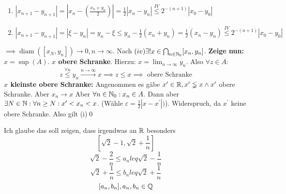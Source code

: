 \begin{subtheorem}
\begin{subproof-headless}
\begin{description}
\begin{itemize}
\begin{description}
\begin{enumerate}[label=(\alph*)]
									\item $ | x_{n+1} - y_{n+1} | = \left| x_n - \left( \frac{x_n + y_n}{2} \right) \right| = \frac{1}{2} | x_n - y_n | \overset{IV}{\leq} 2^{-(n+1)} |x_0 - y_0| $
									\item $ | x_{n+1} - y_{n+1} | = | \xi - y_n | = y_n - \xi \leq y_n - \frac{1}{2} (x_n + y_n) = \frac{1}{2} (x_n - y_n) \overset{IV}{\leq} 2^{-(n+1)} | x_0 - y_0 | $
								\end{enumerate}
						\end{description}
						$ \implies \operatorname{diam}([x_N, y_n]) \to 0, n \to \infty $. Nach $ (iv) \exists! x \in \bigcap_{n \in \mathbb{N}_0}[x_n, y_n] $. \textbf{Zeige nun:} $ x = \sup(A) $. \textbf{$x$ obere Schranke}. Hierzu: $ x = \lim_{n\to\infty} y_n $. Also $ \forall z \in A $:
						\[ z \overset{\forall n}{\leq} y_n \overset{n\to\infty}{\to} x \implies z \leq x \implies \text{ obere Schranke} \]
						\textbf{$x$ kleinste obere Schranke:}
						Angenommen es gäbe $ x^\prime \in \mathbb{R}, x^\prime \lneqq x \wedge x^\prime$ obere Schranke.
						Aber $ x_n \to x $ Aber $ \forall n \in \mathbb{N}_0 : x_n \in A$.
						Dann aber $ \exists N \in \mathbb{N} : \forall n \geq N : x^\prime < x_n < x $.
						(Wähle $ \varepsilon = \frac{1}{2} | x - x^\prime|) $).
						Widerspruch, da $ x^\prime $ keine obere Schranke. Also gilt (i)\qed
				\end{itemize}
		\end{description}
	\end{subproof-headless}
\end{subtheorem}

\begin{subexample*}
	Ich glaube das soll zeigen, dass irgendwas an $ \mathbb{R} $ besonders
	\[ [ \sqrt{2} - 1, \sqrt{2} + \frac{1}{n} ] \]
	\[ \sqrt{2} - \frac{2}{n} \leq a_n leq \sqrt{2} - \frac{1}{n} \]
	\[ \sqrt{2} + \frac{1}{n} \leq b_n leq \sqrt{2} + \frac{1}{n} \]
	\[ [ a_n, b_n ], a_n, b_n \in \mathbb{Q} \]
\end{subexample*}

